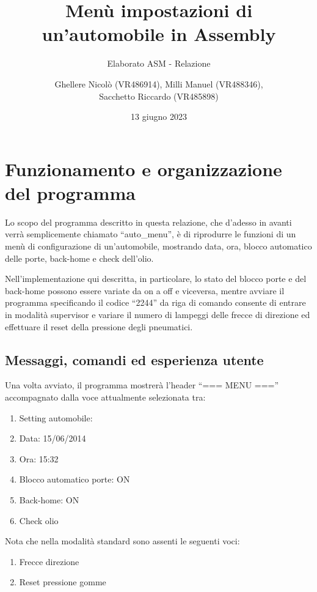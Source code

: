 \documentclass[
  12pt,
  a4paper,
  headings=optiontoheadandtoc
]{scrreprt}
\author{Ghellere Nicolò (VR486914), Milli Manuel (VR488346),\\Sacchetto Riccardo (VR485898)}
\date{13 giugno 2023}
\title{Menù impostazioni di un'automobile in Assembly}
\subtitle{Elaborato ASM - Relazione}
\begin{document}
\maketitle

\renewcommand*\contentsname{Indice}
\tableofcontents
\newpage

\chapter[nonumber=true]{Funzionamento e organizzazione del programma}

Lo scopo del programma descritto in questa relazione, che d'adesso in avanti verrà semplicemente chiamato ``auto\_menu'', è di riprodurre le funzioni di un menù di configurazione di un'automobile, mostrando data, ora, blocco automatico delle porte, back-home e check dell'olio.

Nell'implementazione qui descritta, in particolare, lo stato del blocco porte e del back-home possono essere variate da on a off e viceversa, mentre avviare il programma specificando il codice ``2244'' da riga di comando consente di entrare in modalità supervisor e variare il numero di lampeggi delle frecce di direzione ed effettuare il reset della pressione degli pneumatici.

\section[nonumber=true]{Messaggi, comandi ed esperienza utente}

Una volta avviato, il programma mostrerà l'header ``=== MENU ==='' accompagnato dalla voce attualmente selezionata tra:

\begin{enumerate}
\item Setting automobile:
\item Data: 15/06/2014
\item Ora: 15:32
\item Blocco automatico porte: ON
\item Back-home: ON
\item Check olio
\end{enumerate}

Nota che nella modalità standard sono assenti le seguenti voci:

\begin{enumerate}[start = 7]
\item Frecce direzione
\item Reset pressione gomme
\end{enumerate}
\end{document}
